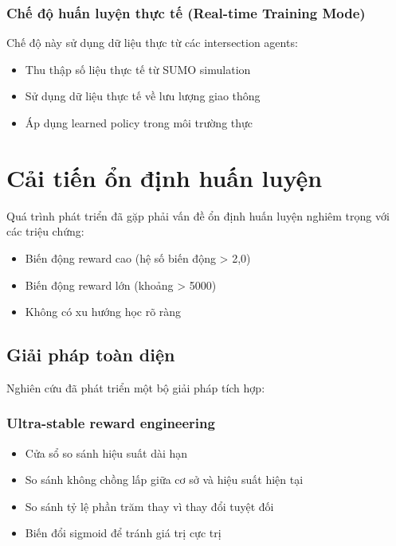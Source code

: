 \subsubsection{Chế độ huấn luyện thực tế (Real-time Training Mode)}
Chế độ này sử dụng dữ liệu thực từ các intersection agents:
\begin{itemize}
    \item Thu thập số liệu thực tế từ SUMO simulation

    \item Sử dụng dữ liệu thực tế về lưu lượng giao thông

    \item Áp dụng learned policy trong môi trường thực
\end{itemize}

\section{Cải tiến ổn định huấn luyện}

Quá trình phát triển đã gặp phải vấn đề ổn định huấn luyện nghiêm trọng với các
triệu chứng:
\begin{itemize}
    \item Biến động reward cao (hệ số biến động > 2,0)

    \item Biến động reward lớn (khoảng > 5000)

    \item Không có xu hướng học rõ ràng
\end{itemize}

\subsection{Giải pháp toàn diện}
Nghiên cứu đã phát triển một bộ giải pháp tích hợp:

\subsubsection{Ultra-stable reward engineering}
\begin{itemize}
    \item Cửa sổ so sánh hiệu suất dài hạn

    \item So sánh không chồng lấp giữa cơ sở và hiệu suất hiện tại

    \item So sánh tỷ lệ phần trăm thay vì thay đổi tuyệt đối

    \item Biến đổi sigmoid để tránh giá trị cực trị
\end{itemize}

